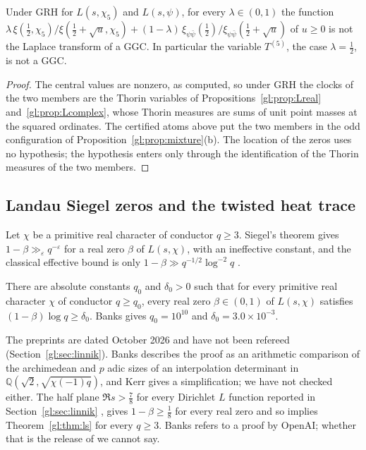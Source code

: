 \begin{proposition}\label{gl:prop:mod5}
Under GRH for $L(s,\chi_5)$ and $L(s,\psi)$, for every $\lambda\in(0,1)$ the function $\lambda\,\xi(\tfrac12,\chi_5)/\xi(\tfrac12+\sqrt u,\chi_5)+(1-\lambda)\,\xi_{\psi\bar\psi}(\tfrac12)/\xi_{\psi\bar\psi}(\tfrac12+\sqrt u)$ of $u\ge0$ is not the Laplace transform of a GGC. In particular the variable $T^{(5)}$, the case $\lambda=\tfrac12$, is not a GGC.
\end{proposition}

\begin{proof}
The central values are nonzero, as computed, so under GRH the clocks of the two members are the Thorin variables of Propositions~\ref{gl:prop:Lreal} and~\ref{gl:prop:Lcomplex}, whose Thorin measures are sums of unit point masses at the squared ordinates. The certified atoms above put the two members in the odd configuration of Proposition~\ref{gl:prop:mixture}(b). The location of the zeros uses no hypothesis; the hypothesis enters only through the identification of the Thorin measures of the two members.
\end{proof}

\subsection{Landau Siegel zeros and the twisted heat trace}\label{gl:sec:landau}

Let $\chi$ be a primitive real character of conductor $q\ge3$. Siegel's theorem gives $1-\beta\gg_\varepsilon q^{-\varepsilon}$ for a real zero $\beta$ of $L(s,\chi)$, with an ineffective constant, and the classical effective bound is only $1-\beta\gg q^{-1/2}\log^{-2}q$ \cite{Davenport}.

\begin{theorem}\label{gl:thm:ls}
There are absolute constants $q_0$ and $\delta_0>0$ such that for every primitive real character $\chi$ of conductor $q\ge q_0$, every real zero $\beta\in(0,1)$ of $L(s,\chi)$ satisfies $(1-\beta)\log q\ge\delta_0$. Banks gives $q_0=10^{10}$ and $\delta_0=3.0\times10^{-3}$.
\end{theorem}

The preprints \cite{Banks26,Kerr26} are dated October 2026 and have not been refereed (Section~\ref{gl:sec:linnik}). Banks describes the proof as an arithmetic comparison of the archimedean and $p$ adic sizes of an interpolation determinant in $\mathbb Q(\sqrt2,\sqrt{\chi(-1)q})$, and Kerr gives a simplification; we have not checked either. The half plane $\Re s>\tfrac78$ for every Dirichlet $L$ function reported in Section~\ref{gl:sec:linnik} \cite{OAI26a}, gives $1-\beta\ge\tfrac18$ for every real zero and so implies Theorem~\ref{gl:thm:ls} for every $q\ge3$. Banks refers to a proof by OpenAI; whether that is the release of \cite{OAI26a} we cannot say.

